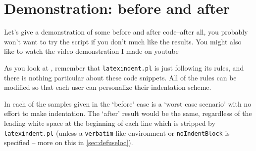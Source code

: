 \section{Demonstration: before and after}
Let's give a demonstration of some before and after code--after all, you probably
won't want to try the script if you don't much like the results. You might also
like to watch the video demonstration I made on youtube \cite{cmh:videodemo}

As you look at , remember
that \texttt{latexindent.pl} is just following its rules, and there is nothing
particular about these code snippets. All of the rules can be modified
so that each user can personalize their indentation scheme.

In each of the samples given in 
the `before' case is a `worst case scenario' with no effort to make indentation. The `after'
result would be the same, regardless of the leading white space at the beginning of
each line which is stripped by \texttt{latexindent.pl} (unless a \texttt{verbatim}-like
environment or \texttt{noIndentBlock} is specified -- more on this in \cref{sec:defuseloc}).

\begin{sidebyside}
	\centering
	\begin{minipage}{.45\linewidth}
	\end{minipage}\hfill
	\begin{minipage}{.45\linewidth}
	\end{minipage}%

	\begin{minipage}{.45\linewidth}
	\end{minipage}\hfill
	\begin{minipage}{.45\linewidth}
	\end{minipage}%

	\begin{minipage}{.45\linewidth}
	\end{minipage}\hfill
	\begin{minipage}{.45\linewidth}
	\end{minipage}%
\end{sidebyside}


